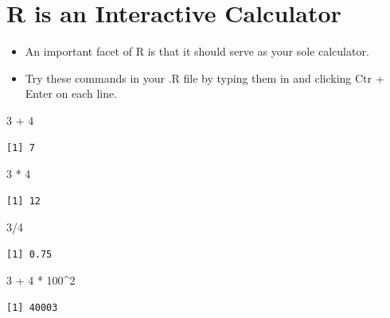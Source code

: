 \documentclass[
  letterpaper,
  DIV=11,
  numbers=noendperiod]{scrreprt}
\newenvironment{Shaded}{\begin{snugshade}}{\end{snugshade}}
\newcommand{\DecValTok}[1]{\textcolor[rgb]{0.68,0.00,0.00}{#1}}
\newcommand{\SpecialCharTok}[1]{\textcolor[rgb]{0.37,0.37,0.37}{#1}}
\providecommand{\tightlist}{%
  \setlength{\itemsep}{0pt}\setlength{\parskip}{0pt}}\usepackage{longtable,booktabs,array}
\begin{document}
\section{R is an Interactive
Calculator}\label{r-is-an-interactive-calculator}

\begin{itemize}
\tightlist
\item
  An important facet of R is that it should serve as your sole
  calculator.
\item
  Try these commands in your .R file by typing them in and clicking Ctr
  + Enter on each line.
\end{itemize}

\begin{Shaded}
\begin{Highlighting}[]
\DecValTok{3} \SpecialCharTok{+} \DecValTok{4}
\end{Highlighting}
\end{Shaded}

\begin{verbatim}
[1] 7
\end{verbatim}

\begin{Shaded}
\begin{Highlighting}[]
\DecValTok{3} \SpecialCharTok{*} \DecValTok{4}
\end{Highlighting}
\end{Shaded}

\begin{verbatim}
[1] 12
\end{verbatim}

\begin{Shaded}
\begin{Highlighting}[]
\DecValTok{3}\SpecialCharTok{/}\DecValTok{4}
\end{Highlighting}
\end{Shaded}

\begin{verbatim}
[1] 0.75
\end{verbatim}

\begin{Shaded}
\begin{Highlighting}[]
\DecValTok{3} \SpecialCharTok{+} \DecValTok{4} \SpecialCharTok{*} \DecValTok{100}\SpecialCharTok{\^{}}\DecValTok{2}
\end{Highlighting}
\end{Shaded}

\begin{verbatim}
[1] 40003
\end{verbatim}
\end{document}

